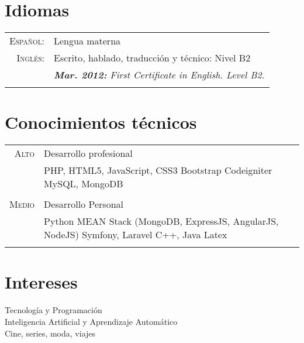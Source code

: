\documentclass[a4paper,10pt]{article}
\begin{document}
\section{Idiomas}
\begin{tabular}{rl}
	\textsc{Español:}&	Lengua materna\\
	\textsc{Inglés:}&	Escrito, hablado, traducción y técnico: Nivel B2\\&
	\emph{\textbf{Mar. 2012:} First Certificate in English. Level B2.}\\&\\
	
\end{tabular}

\section{Conocimientos técnicos}
\begin{tabular}{r|p{11cm}}

 	\textsc{Alto} & Desarrollo profesional \\&
	\footnotesize{
		PHP, HTML5, JavaScript, CSS3 \newline
		Bootstrap \newline
		Codeigniter \newline
		MySQL, MongoDB
	}
	\\\multicolumn{2}{c}{} \\

 	\textsc{Medio} & Desarrollo Personal \\&
	\footnotesize{
		Python \newline
		MEAN Stack (MongoDB, ExpressJS, AngularJS, NodeJS)  \newline
		Symfony, Laravel \newline
		C++, Java \newline
		Latex
	}
	\\\multicolumn{2}{c}{} \\
\end{tabular}

\section{Intereses}
Tecnología y Programación\\
Inteligencia Artificial y Aprendizaje Automático\\
Cine, series, moda, viajes
\end{document}
